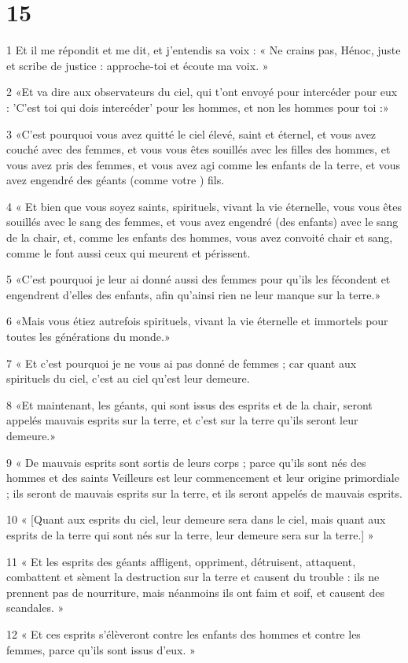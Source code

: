 \chapter{15}

\par 1 Et il me répondit et me dit, et j'entendis sa voix : « Ne crains pas, Hénoc, juste et scribe de justice : approche-toi et écoute ma voix. »
\par 2 «Et va dire aux observateurs du ciel, qui t'ont envoyé pour intercéder pour eux : 'C'est toi qui dois intercéder' pour les hommes, et non les hommes pour toi :»
\par 3 «C'est pourquoi vous avez quitté le ciel élevé, saint et éternel, et vous avez couché avec des femmes, et vous vous êtes souillés avec les filles des hommes, et vous avez pris des femmes, et vous avez agi comme les enfants de la terre, et vous avez engendré des géants (comme votre ) fils.
\par 4 « Et bien que vous soyez saints, spirituels, vivant la vie éternelle, vous vous êtes souillés avec le sang des femmes, et vous avez engendré (des enfants) avec le sang de la chair, et, comme les enfants des hommes, vous avez convoité chair et sang, comme le font aussi ceux qui meurent et périssent.
\par 5 «C'est pourquoi je leur ai donné aussi des femmes pour qu'ils les fécondent et engendrent d'elles des enfants, afin qu'ainsi rien ne leur manque sur la terre.»
\par 6 «Mais vous étiez autrefois spirituels, vivant la vie éternelle et immortels pour toutes les générations du monde.»
\par 7 « Et c’est pourquoi je ne vous ai pas donné de femmes ; car quant aux spirituels du ciel, c’est au ciel qu’est leur demeure.
\par 8 «Et maintenant, les géants, qui sont issus des esprits et de la chair, seront appelés mauvais esprits sur la terre, et c'est sur la terre qu'ils seront leur demeure.»
\par 9 « De mauvais esprits sont sortis de leurs corps ; parce qu'ils sont nés des hommes et des saints Veilleurs est leur commencement et leur origine primordiale ; ils seront de mauvais esprits sur la terre, et ils seront appelés de mauvais esprits.
\par 10 « [Quant aux esprits du ciel, leur demeure sera dans le ciel, mais quant aux esprits de la terre qui sont nés sur la terre, leur demeure sera sur la terre.] »
\par 11 « Et les esprits des géants affligent, oppriment, détruisent, attaquent, combattent et sèment la destruction sur la terre et causent du trouble : ils ne prennent pas de nourriture, mais néanmoins ils ont faim et soif, et causent des scandales. »
\par 12 « Et ces esprits s'élèveront contre les enfants des hommes et contre les femmes, parce qu'ils sont issus d'eux. »

